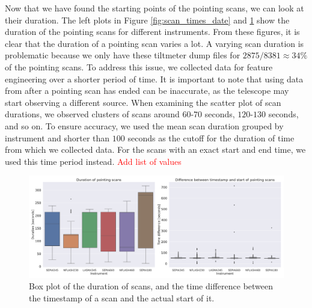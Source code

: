 Now that we have found the starting points of the pointing scans, we can look at their duration.
The left plots in Figure \ref{fig:scan_times_date} and \ref{fig:scan_times_box} show the duration of the pointing scans for different instruments.
From these figures, it is clear that the duration of a pointing scan varies a lot.
A varying scan duration is problematic because we only have these tiltmeter dump files for $2875/8381\approx 34\%$ of the pointing scans. 
To address this issue, we collected data for feature engineering over a shorter period of time.
It is important to note that using data from after a pointing scan has ended can be inaccurate, as the telescope may start observing a different source.
When examining the scatter plot of scan durations, we observed clusters of scans around $60$-$70$ seconds, $120$-$130$ seconds, and so on.
To ensure accuracy, we used the mean scan duration grouped by instrument and shorter than $100$ seconds as the cutoff for the duration of time from which we collected data.
For the scans with an exact start and end time, we used this time period instead. \textcolor{red}{Add list of values}


\begin{figure}[H]
    \centering
    \includegraphics[width=1.1\textwidth]{Tiltmeter plots/scan_duration_distribution_rx.pdf}
    \caption[Box plots with pointing scan duration and start time]{Box plot of the duration of scans, and the time difference between the timestamp of a scan and the actual start of it.}
    \label{fig:scan_times_box}
\end{figure}


